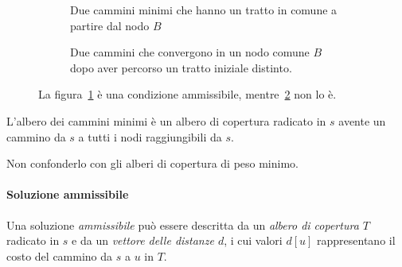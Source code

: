 \begin{figure}[H]\centering
	\begin{subfigure}[t]{.5\linewidth}\centering
		
		\caption{Due cammini minimi che hanno un tratto in comune a partire dal nodo \(B\)}%
		\label{fig:walk-common-part}
	\end{subfigure}%
	\begin{subfigure}[t]{.5\linewidth}\centering
		
		\caption{Due cammini che convergono in un nodo comune \(B\) dopo aver percorso un tratto iniziale distinto.}%
		\label{fig:walk-shared-node}
	\end{subfigure}
	\caption{La figura~\ref{fig:walk-common-part} è una condizione ammissibile, mentre~\ref{fig:walk-shared-node} non lo è.}%
	\label{fig:sottostruttura-ottima}
\end{figure}

\begin{definition}
L'albero dei cammini minimi è un albero di copertura radicato in \(s\) avente un cammino da \(s\) a tutti i nodi raggiungibili da \(s\).
\end{definition}

\begin{note}
Non confonderlo con gli alberi di copertura di peso minimo.
\end{note}


\paragraph{Soluzione ammissibile}
Una soluzione \emph{ammissibile} può essere descritta da un \emph{albero di copertura \(T\)} radicato in \(s\) e da un \emph{vettore delle distanze \(d\)}, i cui valori \(d[u]\) rappresentano il costo del cammino da \(s\) a \(u\) in \(T\).

